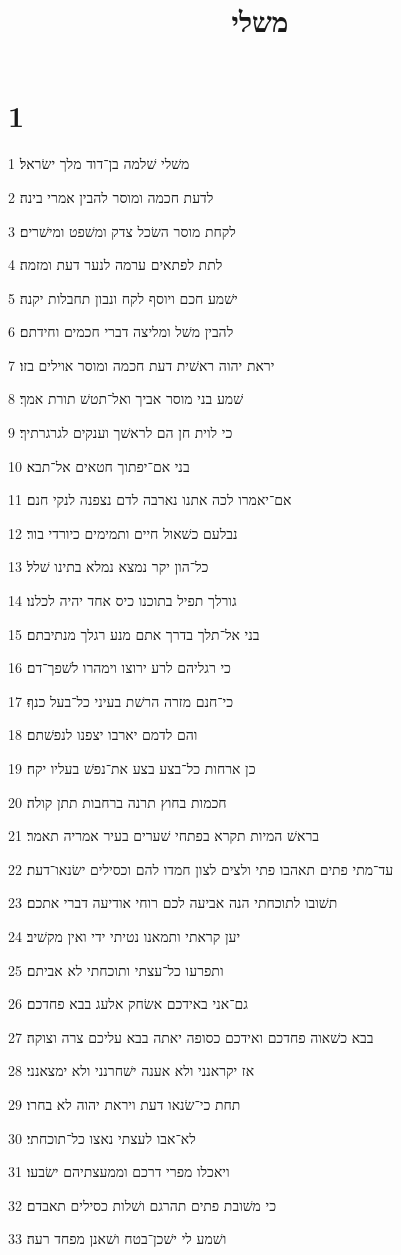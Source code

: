 

\title{משלי}


\chapter{1}

\par 1 משׁלי שׁלמה בן־דוד מלך ישׂראל׃
\par 2 לדעת חכמה ומוסר להבין אמרי בינה׃
\par 3 לקחת מוסר השׂכל צדק ומשׁפט ומישׁרים׃
\par 4 לתת לפתאים ערמה לנער דעת ומזמה׃
\par 5 ישׁמע חכם ויוסף לקח ונבון תחבלות יקנה׃
\par 6 להבין משׁל ומליצה דברי חכמים וחידתם׃
\par 7 יראת יהוה ראשׁית דעת חכמה ומוסר אוילים בזו׃
\par 8 שׁמע בני מוסר אביך ואל־תטשׁ תורת אמך׃
\par 9 כי לוית חן הם לראשׁך וענקים לגרגרתיך׃
\par 10 בני אם־יפתוך חטאים אל־תבא׃
\par 11 אם־יאמרו לכה אתנו נארבה לדם נצפנה לנקי חנם׃
\par 12 נבלעם כשׁאול חיים ותמימים כיורדי בור׃
\par 13 כל־הון יקר נמצא נמלא בתינו שׁלל׃
\par 14 גורלך תפיל בתוכנו כיס אחד יהיה לכלנו׃
\par 15 בני אל־תלך בדרך אתם מנע רגלך מנתיבתם׃
\par 16 כי רגליהם לרע ירוצו וימהרו לשׁפך־דם׃
\par 17 כי־חנם מזרה הרשׁת בעיני כל־בעל כנף׃
\par 18 והם לדמם יארבו יצפנו לנפשׁתם׃
\par 19 כן ארחות כל־בצע בצע את־נפשׁ בעליו יקח׃
\par 20 חכמות בחוץ תרנה ברחבות תתן קולה׃
\par 21 בראשׁ המיות תקרא בפתחי שׁערים בעיר אמריה תאמר׃
\par 22 עד־מתי פתים תאהבו פתי ולצים לצון חמדו להם וכסילים ישׂנאו־דעת׃
\par 23 תשׁובו לתוכחתי הנה אביעה לכם רוחי אודיעה דברי אתכם׃
\par 24 יען קראתי ותמאנו נטיתי ידי ואין מקשׁיב׃
\par 25 ותפרעו כל־עצתי ותוכחתי לא אביתם׃
\par 26 גם־אני באידכם אשׂחק אלעג בבא פחדכם׃
\par 27 בבא כשׁאוה פחדכם ואידכם כסופה יאתה בבא עליכם צרה וצוקה׃
\par 28 אז יקראנני ולא אענה ישׁחרנני ולא ימצאנני׃
\par 29 תחת כי־שׂנאו דעת ויראת יהוה לא בחרו׃
\par 30 לא־אבו לעצתי נאצו כל־תוכחתי׃
\par 31 ויאכלו מפרי דרכם וממעצתיהם ישׂבעו׃
\par 32 כי משׁובת פתים תהרגם ושׁלות כסילים תאבדם׃
\par 33 ושׁמע לי ישׁכן־בטח ושׁאנן מפחד רעה׃

